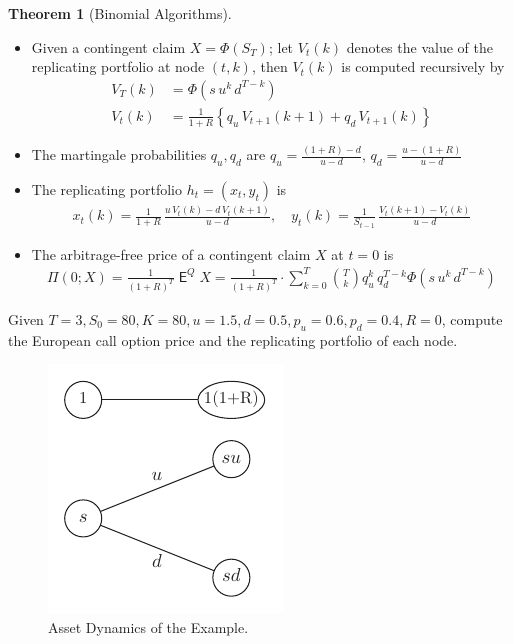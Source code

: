 \documentclass[10pt,handout]{beamer}
\newcommand{\ds}{\displaystyle}
\DeclareMathOperator\expc{\mathsf{E}}
\theoremstyle{definition}
\newtheorem*{thm}{Theorem}
\begin{document}
\begin{frame}
  \begin{thm}[Binomial Algorithms]
    \begin{itemize}
      \item Given a contingent claim $X=\Phi(S_T)$; let $V_t(k)$ denotes the value of the replicating portfolio at node $(t, k)$, then $V_t(k)$ is computed recursively by 
        \begin{align*}
          V_T(k) &= \Phi(s\,u^k\,d^{T-k}) \\
          V_t(k) &= \frac{1}{1+R}\left\{q_u\,V_{t+1}(k+1) + q_d\,V_{t+1}(k)\right\}
        \end{align*}
      \item The martingale probabilities $q_u, q_d$ are $\ds q_u = \frac{(1+R)-d}{u-d}$, $\ds q_d = \frac{u-(1+R)}{u-d}$
      \item The replicating portfolio $h_t = (x_t, y_t)$ is \vspace{-3mm}
        \begin{align*}
          x_t(k) = \frac{1}{1+R}\,\frac{u\,V_t(k)-d\,V_t(k+1)}{u-d}, \quad y_t(k) = \frac{1}{S_{t-1}}\,\frac{V_t(k+1)-V_t(k)}{u-d}
        \end{align*}
      \item The arbitrage-free price of a contingent claim $X$ at $t=0$ is \vspace{-3mm} 
    \begin{align*}
      \Pi(0;X) = \frac{1}{(1 + R)^T}\expc^Q X = \frac{1}{(1 + R)^T}\cdot\sum_{k=0}^T\binom{T}{k}q_u^k\,q_d^{T-k}\Phi(s\,u^k\,d^{T-k})
    \end{align*}
    \end{itemize}
  \end{thm}
\end{frame}

\begin{frame}
  \begin{example}
    Given $T=3, S_0=80, K=80, u=1.5, d=0.5, p_u=0.6, p_d=0.4, R=0$, compute the European call option price and the replicating portfolio of each node.
  \end{example}
  \begin{figure}
    \centering
    \includegraphics[scale=.9,page=4]{fig/note08/bjork.pdf}
    \caption{Asset Dynamics of the Example.}
  \end{figure}  
\end{frame}
\end{document}

